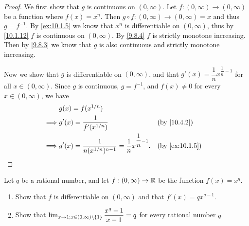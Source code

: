\begin{proof}
  We first show that \(g\) is continuous on \((0, \infty)\).
  Let \(f : (0, \infty) \to (0, \infty)\) be a function where \(f(x) = x^n\).
  Then \(g \circ f : (0, \infty) \to (0, \infty) = x\) and thus \(g = f^{-1}\).
  By \cref{ex:10.1.5} we know that \(x^n\) is differentiable on \((0, \infty)\), thus by \cref{10.1.12} \(f\) is continuous on \((0, \infty)\).
  By \cref{9.8.4} \(f\) is strictly monotone increasing.
  Then by \cref{9.8.3} we know that \(g\) is also continuous and strictly monotone increasing.

  Now we show that \(g\) is differentiable on \((0, \infty)\), and that \(g'(x) = \dfrac{1}{n} x^{\dfrac{1}{n} - 1}\) for all \(x \in (0, \infty)\).
  Since \(g\) is continuous, \(g = f^{-1}\), and \(f(x) \neq 0\) for every \(x \in (0, \infty)\), we have
  \begin{align*}
             & g(x) = f(x^{1 / n})                                                                               \\
    \implies & g'(x) = \dfrac{1}{f'(x^{1 / n})}                                              &  & \by{10.4.2}    \\
    \implies & g'(x) = \dfrac{1}{n (x^{1 / n})^{n - 1}} = \dfrac{1}{n} x^{\dfrac{1}{n} - 1}. &  & \by{ex:10.1.5}
  \end{align*}
\end{proof}

\begin{ex}\label{ex:10.4.2}
  Let \(q\) be a rational number, and let \(f : (0, \infty) \to \mathbb{R}\) be the function \(f(x) = x^q\).
  \begin{enumerate}
    \item Show that \(f\) is differentiable on \((0, \infty)\) and that \(f'(x) = q x^{q - 1}\).
    \item Show that \(\lim_{x \to 1 ; x \in (0, \infty) \setminus \left\lbrace1\right\rbrace} \dfrac{x^q - 1}{x - 1} = q\) for every rational number \(q\).
  \end{enumerate}
\end{ex}

